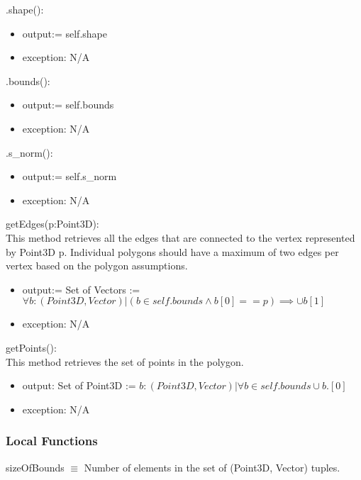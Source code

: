\documentclass[12pt, titlepage]{article}
\begin{document}
\noindent .shape():
\begin{itemize}
	\item output:= self.shape
	\item exception: N/A
\end{itemize}

\noindent .bounds():
\begin{itemize}
	\item output:= self.bounds
	\item exception: N/A
\end{itemize}

\noindent .s\_norm():
\begin{itemize}
	\item output:= self.s\_norm
	\item exception: N/A
\end{itemize}

\noindent getEdges(p:Point3D):\\
This method retrieves all the edges that are connected to the vertex 
represented by Point3D p. Individual polygons should have a maximum of two 
edges per vertex based on the polygon assumptions.\\
\begin{itemize}
	\item output:= Set of Vectors := $\forall b : (Point3D,Vector) | (b \in 
	self.bounds \wedge b[0] == p) \implies \cup b[1] $
	\item exception: N/A
\end{itemize}

\noindent getPoints():\\
This method retrieves the set of points in the polygon.\\
\begin{itemize}
	\item output: Set of Point3D := $b: (Point3D, Vector)| \forall b \in 
	self.bounds  \cup b.[0]$
	\item exception: N/A
\end{itemize}


\subsubsection{Local Functions}
sizeOfBounds $\equiv$ Number of elements in the set of (Point3D, Vector) 
tuples.\\

\end{document}
